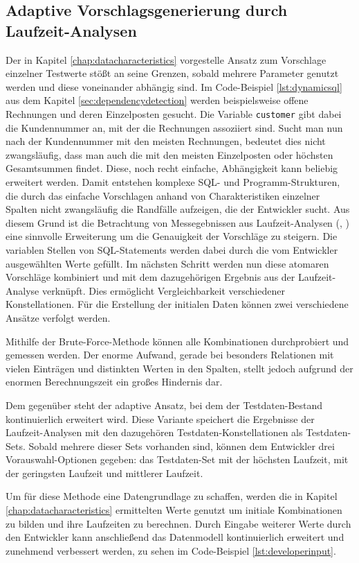 \subsection{Adaptive Vorschlagsgenerierung durch Laufzeit-Analysen}\label{chap:adaptive}
Der in Kapitel \ref{chap:datacharacteristics} vorgestelle Ansatz zum Vorschlage einzelner Testwerte stößt an seine Grenzen, sobald mehrere Parameter genutzt werden und diese voneinander abhängig sind.
Im Code-Beispiel \ref{lst:dynamicsql} aus dem Kapitel \ref{sec:dependencydetection} werden beispielsweise offene Rechnungen und deren Einzelposten gesucht.
Die Variable \texttt{customer} gibt dabei die Kundennummer an, mit der die Rechnungen assoziiert sind.
Sucht man nun nach der Kundennummer mit den meisten Rechnungen, bedeutet dies nicht zwangsläufig, dass man auch die mit den meisten Einzelposten oder höchsten Gesamtsummen findet.
Diese, noch recht einfache, Abhängigkeit kann beliebig erweitert werden.
Damit entstehen komplexe SQL- und Programm-Strukturen, die durch das einfache Vorschlagen anhand von Charakteristiken einzelner Spalten nicht zwangsläufig die Randfälle aufzeigen, die der Entwickler sucht.
Aus diesem Grund ist die Betrachtung von Messegebnissen aus Laufzeit-Analysen (\cite{Exner2014}, \cite{Mues2014}) eine sinnvolle Erweiterung um die Genauigkeit der Vorschläge zu steigern.
Die variablen Stellen von SQL-Statements werden dabei durch die vom Entwickler ausgewählten Werte gefüllt.
Im nächsten Schritt werden nun diese atomaren Vorschläge kombiniert und mit dem dazugehörigen Ergebnis aus der Laufzeit-Analyse verknüpft.
Dies ermöglicht Vergleichbarkeit verschiedener Konstellationen.
Für die Erstellung der initialen Daten können zwei verschiedene Ansätze verfolgt werden.

Mithilfe der Brute-Force-Methode können alle Kombinationen durchprobiert und gemessen werden.
Der enorme Aufwand, gerade bei besonders Relationen mit vielen Einträgen und distinkten Werten in den Spalten, stellt jedoch aufgrund der enormen Berechnungszeit ein großes Hindernis dar.

Dem gegenüber steht der adaptive Ansatz, bei dem der Testdaten-Bestand kontinuierlich erweitert wird.
Diese Variante speichert die Ergebnisse der Laufzeit-Analysen mit den dazugehören Testdaten-Konstellationen als Testdaten-Sets.
Sobald mehrere dieser Sets vorhanden sind, können dem Entwickler drei Vorauswahl-Optionen gegeben: das Testdaten-Set mit der höchsten Laufzeit, mit der geringsten Laufzeit und mittlerer Laufzeit.

Um für diese Methode eine Datengrundlage zu schaffen, werden die in Kapitel \ref{chap:datacharacteristics} ermittelten Werte genutzt um initiale Kombinationen zu bilden und ihre Laufzeiten zu berechnen.
Durch Eingabe weiterer Werte durch den Entwickler kann anschließend das Datenmodell kontinuierlich erweitert und zunehmend verbessert werden, zu sehen im Code-Beispiel \ref{lst:developerinput}.

